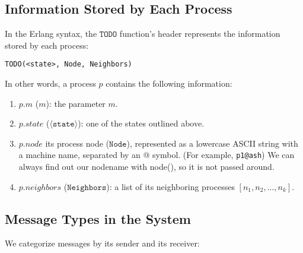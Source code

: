 \documentclass[11pt]{article}
\begin{document}
\subsection{Information Stored by Each Process}
In the Erlang syntax, the $\texttt{TODO}$ function's header represents
the information stored by each process:
\begin{lstlisting}
TODO(<state>, Node, Neighbors)
\end{lstlisting}
In other words, a process $p$ contains the following information:
\begin{enumerate}
\item $p.m$ ($m$): the parameter $m$.
\item $p.state$ ($\langle\texttt{state}\rangle$): one of the \numStates states outlined above.
\item $p.node$ its process node ($\texttt{Node}$), represented as a lowercase ASCII string with a machine name, separated by an @ symbol. (For example, \texttt{p1@ash}) We can always find out our nodename with node(), so it is not passed around.
\item $p.neighbors$ ($\texttt{Neighbors}$): a list of its neighboring processes $[n_1, n_2, \ldots, n_k]$.
\end{enumerate}

\subsection{Message Types in the System}
We categorize messages by its sender and its receiver:
\end{document}
